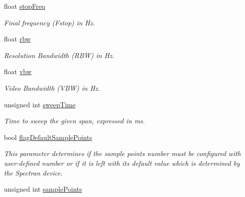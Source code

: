 \begin{DoxyCompactItemize}
float \hyperlink{structBandParameters_a16b27f71c4d551562078b583eb603a75}{stop\+Freq}
\begin{DoxyCompactList}\small\item\em Final frequency (Fstop) in Hz. \end{DoxyCompactList}\item 
\mbox{\label{structBandParameters_a467e21d5bd9dd59fd57d6e43f5fa3dcb}} 
float \hyperlink{structBandParameters_a467e21d5bd9dd59fd57d6e43f5fa3dcb}{rbw}
\begin{DoxyCompactList}\small\item\em Resolution Bandwidth (R\+BW) in Hz. \end{DoxyCompactList}\item 
\mbox{\label{structBandParameters_aee179b682657437dd9a7f45e7054ae97}} 
float \hyperlink{structBandParameters_aee179b682657437dd9a7f45e7054ae97}{vbw}
\begin{DoxyCompactList}\small\item\em Video Bandwidth (V\+BW) in Hz. \end{DoxyCompactList}\item 
\mbox{\label{structBandParameters_a184931085fad14897c5639c5a321fd1d}} 
unsigned int \hyperlink{structBandParameters_a184931085fad14897c5639c5a321fd1d}{sweep\+Time}
\begin{DoxyCompactList}\small\item\em Time to sweep the given span, expressed in ms. \end{DoxyCompactList}\item 
\mbox{\label{structBandParameters_ad66053858886e8e15ec84f5d25aa5504}} 
bool \hyperlink{structBandParameters_ad66053858886e8e15ec84f5d25aa5504}{flag\+Default\+Sample\+Points}
\begin{DoxyCompactList}\small\item\em This parameter determines if the sample points number must be configured with user-\/defined number or if it is left with its default value which is determined by the Spectran device. \end{DoxyCompactList}\item 
\mbox{\label{structBandParameters_a8178a7d57a1963f237b0d74783b22b23}} 
unsigned int \hyperlink{structBandParameters_a8178a7d57a1963f237b0d74783b22b23}{sample\+Points}

\end{DoxyCompactItemize}
